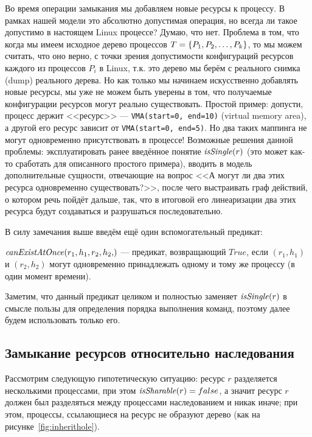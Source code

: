 \begin{note}
\label{note:badresourceconfig}
Во время операции замыкания мы добавляем новые ресурсы к процессу. В рамках нашей модели это абсолютно допустимая операция, но всегда ли такое допустимо в настоящем Linux процессе? Думаю, что нет. Проблема в том, что когда мы имеем исходное дерево процессов $T = \left\lbrace P_1, P_2, \ldots, P_k \right\rbrace$, то мы можем считать, что оно верно, с точки зрения допустимости конфигураций ресурсов каждого из процессов $P_i$ в Linux, т.к. это дерево мы берём с реального снимка (dump) реального дерева. Но как только мы начинаем искусственно добавлять новые ресурсы, мы уже не можем быть уверены в том, что получаемые конфигурации ресурсов могут реально существовать. Простой пример: допусти, процесс держит <<ресурс>> --- \texttt{VMA(start=0, end=10)} (virtual memory area), а другой его ресурс зависит от \texttt{VMA(start=0, end=5)}. Но два таких маппинга не могут одновременно присутствовать в процессе! Возможные решения данной проблемы: эксплуатировать ранее введённое понятие $\text{\textit{isSingle}}(r)$ (это может как-то сработать для описанного простого примера), вводить в модель дополнительные сущности, отвечающие на вопрос <<А могут ли два этих ресурса одновременно существовать?>>, после чего выстраивать граф действий, о котором речь пойдёт дальше, так, что в итоговой его линеаризации два этих ресурса будут создаваться и разрушаться последовательно.
\end{note}

В силу замечания выше введём ещё один вспомогательный предикат:

\begin{defn}
$\canExistAtOnce{r_1, h_1, r_2, h_2}$ --- предикат, возвращающий $True$, если $(r_1, h_1)$ и $(r_2, h_2)$ могут одновременно принадлежать одному и тому же процессу (в один момент времени).
\end{defn}

\begin{note}
Заметим, что данный предикат целиком и полностью заменяет $\text{\textit{isSingle}}(r)$ в смысле пользы для определения порядка выполнения команд, поэтому далее будем использовать только его.
\end{note}

\subsection{Замыкание ресурсов относительно наследования}

Рассмотрим следующую гипотетическую ситуацию: ресурс $r$ разделяется несколькими процессами, при этом $\text{\textit{isSharable}}(r) = false$, а значит ресурс $r$ должен был разделяться между процессами наследованием и никак иначе; при этом, процессы, ссылающиеся на ресурс не образуют дерево (как на рисунке~\ref{fig:inherithole}). 

